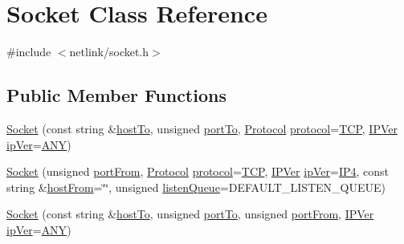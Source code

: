 \hypertarget{classSocket}{}\section{Socket Class Reference}
\label{classSocket}


{\ttfamily \#include $<$netlink/socket.\+h$>$}

\subsection*{Public Member Functions}
\begin{DoxyCompactItemize}
\item 
\hyperlink{classSocket_a91f9a0b4937702a38a29c01f401693eb}{Socket} (const string \&\hyperlink{classSocket_a29c3b32215592f8154975c87f63dcbfb}{host\+To}, unsigned \hyperlink{classSocket_aea64c4f67d903198cff5a6285a0f9a7e}{port\+To}, \hyperlink{core_8h_aac39b55be6469395f55ff0292ad8184c}{Protocol} \hyperlink{classSocket_a4e03da6ff0420bf0a2e123142ce11093}{protocol}=\hyperlink{core_8h_aac39b55be6469395f55ff0292ad8184caa040cd7feeb588104634cdadf35abf1c}{T\+C\+P}, \hyperlink{core_8h_a3afbe2755e4a6912bfce39e7069c2d3d}{I\+P\+Ver} \hyperlink{classSocket_a00640e1194207685a9169d130dd31500}{ip\+Ver}=\hyperlink{core_8h_a3afbe2755e4a6912bfce39e7069c2d3daa00374190265e7b6447db44977a7dff1}{A\+N\+Y})
\item 
\hyperlink{classSocket_a4ebb8b7ca2c5d3d9229a6c6f48a2399b}{Socket} (unsigned \hyperlink{classSocket_acea4e417eb685f5f9c8e743b918cd84e}{port\+From}, \hyperlink{core_8h_aac39b55be6469395f55ff0292ad8184c}{Protocol} \hyperlink{classSocket_a4e03da6ff0420bf0a2e123142ce11093}{protocol}=\hyperlink{core_8h_aac39b55be6469395f55ff0292ad8184caa040cd7feeb588104634cdadf35abf1c}{T\+C\+P}, \hyperlink{core_8h_a3afbe2755e4a6912bfce39e7069c2d3d}{I\+P\+Ver} \hyperlink{classSocket_a00640e1194207685a9169d130dd31500}{ip\+Ver}=\hyperlink{core_8h_a3afbe2755e4a6912bfce39e7069c2d3da7cecc0cd33e7aadefd2826553c9e634e}{I\+P4}, const string \&\hyperlink{classSocket_a12045edc739ce34fbe98e86909951ce1}{host\+From}=\char`\"{}\char`\"{}, unsigned \hyperlink{classSocket_af365c5326acff9571194897b55ae70e5}{listen\+Queue}=D\+E\+F\+A\+U\+L\+T\+\_\+\+L\+I\+S\+T\+E\+N\+\_\+\+Q\+U\+E\+U\+E)
\item 
\hyperlink{classSocket_a8edac8ee6f4e323e870234408e725125}{Socket} (const string \&\hyperlink{classSocket_a29c3b32215592f8154975c87f63dcbfb}{host\+To}, unsigned \hyperlink{classSocket_aea64c4f67d903198cff5a6285a0f9a7e}{port\+To}, unsigned \hyperlink{classSocket_acea4e417eb685f5f9c8e743b918cd84e}{port\+From}, \hyperlink{core_8h_a3afbe2755e4a6912bfce39e7069c2d3d}{I\+P\+Ver} \hyperlink{classSocket_a00640e1194207685a9169d130dd31500}{ip\+Ver}=\hyperlink{core_8h_a3afbe2755e4a6912bfce39e7069c2d3daa00374190265e7b6447db44977a7dff1}{A\+N\+Y})

\end{DoxyCompactItemize}
